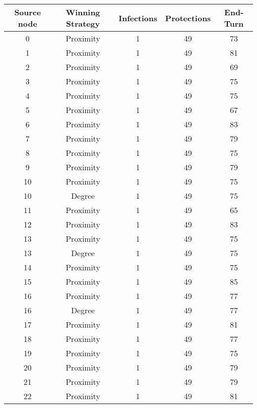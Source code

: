 \documentclass[results.tex]{subfiles}
\begin{document}
\begin{center}
  \begin{tabular}{| c || c | c | c | c |}
    \hline
    {\bfseries Source node} & {\bfseries Winning Strategy} & {\bfseries Infections} & {\bfseries Protections} & {\bfseries End-Turn} \\  %
    \hline\hline
    0 & Proximity & 1 & 49 & 73 \\ 
    \hline
    1 & Proximity & 1 & 49 & 81 \\ 
    \hline
    2 & Proximity & 1 & 49 & 69 \\ 
    \hline
    3 & Proximity & 1 & 49 & 75 \\ 
    \hline
    4 & Proximity & 1 & 49 & 75 \\ 
    \hline
    5 & Proximity & 1 & 49 & 67 \\ 
    \hline
    6 & Proximity & 1 & 49 & 83 \\ 
    \hline
    7 & Proximity & 1 & 49 & 79 \\ 
    \hline
    8 & Proximity & 1 & 49 & 75 \\ 
    \hline
    9 & Proximity & 1 & 49 & 79 \\ 
    \hline
    10 & Proximity & 1 & 49 & 75 \\ 
    \hline
    10 & Degree & 1 & 49 & 75 \\ 
    \hline
    11 & Proximity & 1 & 49 & 65 \\ 
    \hline
    12 & Proximity & 1 & 49 & 83 \\ 
    \hline
    13 & Proximity & 1 & 49 & 75 \\ 
    \hline
    13 & Degree & 1 & 49 & 75 \\ 
    \hline
    14 & Proximity & 1 & 49 & 75 \\ 
    \hline
    15 & Proximity & 1 & 49 & 85 \\ 
    \hline
    16 & Proximity & 1 & 49 & 77 \\ 
    \hline
    16 & Degree & 1 & 49 & 77 \\ 
    \hline
    17 & Proximity & 1 & 49 & 81 \\ 
    \hline
    18 & Proximity & 1 & 49 & 77 \\ 
    \hline
    19 & Proximity & 1 & 49 & 75 \\ 
    \hline
    20 & Proximity & 1 & 49 & 79 \\ 
    \hline
    21 & Proximity & 1 & 49 & 79 \\ 
    \hline
    22 & Proximity & 1 & 49 & 81 \\ 

\end{tabular}
\end{center}
\end{document}
